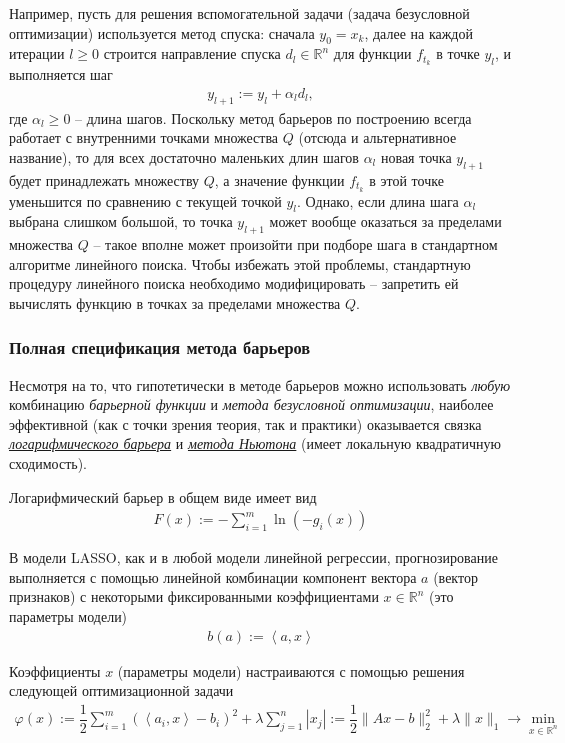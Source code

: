 \documentclass[%
	11pt,
	a4paper,
	utf8,
		]{article}
\begin{document}
Например, пусть для решения вспомогательной задачи (задача безусловной оптимизации) используется метод спуска: сначала $ y_0 = x_k $, далее на каждой итерации $ l \geqslant 0 $ строится направление спуска $ d_l \in \mathbb{R}^n $ для функции $ f_{t_k} $ в точке $ y_l $, и выполняется шаг
\begin{align*}
	y_{l + 1} := y_l + \alpha_l d_l,
\end{align*}
где $ \alpha_l \geqslant 0 $ -- длина шагов. Поскольку метод барьеров по построению всегда работает с внутренними точками множества $ Q $ (отсюда и альтернативное название), то для всех достаточно маленьких длин шагов $ \alpha_l $ новая точка $ y_{l+1} $ будет принадлежать множеству $ Q $, а значение функции $ f_{t_k} $ в этой точке уменьшится по сравнению с текущей точкой $ y_l $. Однако, если длина шага $ \alpha_l $ выбрана слишком большой, то точка $ y_{l+1} $ может вообще оказаться за пределами множества $ Q $ -- такое вполне может произойти при подборе шага в стандартном алгоритме линейного поиска. Чтобы избежать этой проблемы, стандартную процедуру линейного поиска необходимо модифицировать -- запретить ей вычислять функцию в точках за пределами множества $ Q $.

\subsubsection{Полная спецификация метода барьеров}

Несмотря на то, что гипотетически в методе барьеров можно использовать \emph{любую} комбинацию \emph{барьерной функции} и \emph{метода безусловной оптимизации}, наиболее эффективной (как с точки зрения теория, так и практики) оказывается связка \emph{\underline{логарифмического барьера}} и \emph{\underline{метода Ньютона}} (имеет локальную квадратичную сходимость).

Логарифмический барьер в общем виде имеет вид
\begin{align*}
	F(x) := - \sum_{i=1}^m \ln (- g_i(x))
\end{align*}

В модели LASSO, как и в любой модели линейной регрессии, прогнозирование выполняется с помощью линейной комбинации компонент вектора $ a $ (вектор признаков) с некоторыми фиксированными коэффициентами $ x \in \mathbb{R}^n $ (это параметры модели)
\begin{align*}
	b(a) := \left< a, x \right>
\end{align*}

Коэффициенты $ x $ (параметры модели) настраиваются с помощью решения следующей оптимизационной задачи
\begin{align}\label{eq:lasso}
	\varphi(x) := \dfrac{1}{2} \sum_{i=1}^{m} (\left< a_i, x \right> - b_i)^2 + \lambda \sum_{j=1}^{n} | x_j | := \dfrac{1}{2} \| A x - b \|_2^2 + \lambda \| x \|_1 \rightarrow \min_{ x \in \mathbb{R}^n }
\end{align}
\end{document}
